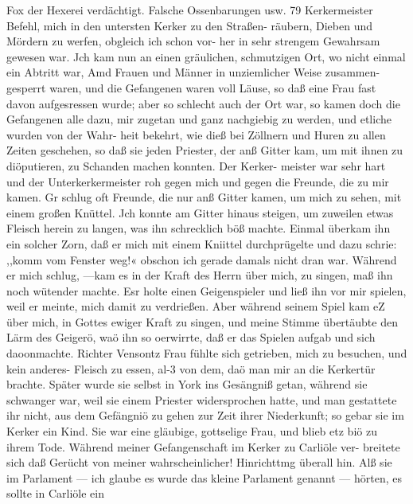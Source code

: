 Fox der Hexerei verdächtigt. Falsche Ossenbarungen usw. 79
Kerkermeister Befehl, mich in den untersten Kerker zu den Straßen-
räubern, Dieben und Mördern zu werfen, obgleich ich schon vor-
her in sehr strengem Gewahrsam gewesen war. Jch kam nun
an einen gräulichen, schmutzigen Ort, wo nicht einmal ein Abtritt
war, Amd Frauen und Männer in unziemlicher Weise zusammen-
gesperrt waren, und die Gefangenen waren voll Läuse, so daß eine
Frau fast davon aufgesressen wurde; aber so schlecht auch der
Ort war, so kamen doch die Gefangenen alle dazu, mir zugetan
und ganz nachgiebig zu werden, und etliche wurden von der Wahr-
heit bekehrt, wie dieß bei Zöllnern und Huren zu allen Zeiten
geschehen, so daß sie jeden Priester, der anß Gitter kam, um mit
ihnen zu diöputieren, zu Schanden machen konnten. Der Kerker-
meister war sehr hart und der Unterkerkermeister roh gegen mich und
gegen die Freunde, die zu mir kamen. Gr schlug oft Freunde,
die nur anß Gitter kamen, um mich zu sehen, mit einem großen
Knüttel. Jch konnte am Gitter hinaus steigen, um zuweilen etwas
Fleisch herein zu langen, was ihn schrecklich böß machte. Einmal
überkam ihn ein solcher Zorn, daß er mich mit einem Kniittel
durchprügelte und dazu schrie: ,,komm vom Fenster weg!« obschon
ich gerade damals nicht dran war. Während er mich schlug,
—kam es in der Kraft des Herrn über mich, zu singen, maß ihn
noch wütender machte. Esr holte einen Geigenspieler und ließ
ihn vor mir spielen, weil er meinte, mich damit zu verdrießen.
Aber während seinem Spiel kam eZ über mich, in Gottes ewiger
Kraft zu singen, und meine Stimme übertäubte den Lärm des
Geigerö, waö ihn so oerwirrte, daß er das Spielen aufgab und
sich daoonmachte.
Richter Vensontz Frau fühlte sich getrieben, mich zu besuchen,
und kein anderes- Fleisch zu essen, al-3 von dem, daö man mir
an die Kerkertür brachte. Später wurde sie selbst in York ins
Gesängniß getan, während sie schwanger war, weil sie einem
Priester widersprochen hatte, und man gestattete ihr nicht, aus
dem Gefängniö zu gehen zur Zeit ihrer Niederkunft; so gebar
sie im Kerker ein Kind. Sie war eine gläubige, gottselige Frau,
und blieb etz biö zu ihrem Tode.
Während meiner Gefangenschaft im Kerker zu Carliöle ver-
breitete sich daß Gerücht von meiner wahrscheinlicher! Hinrichttmg
überall hin. Alß sie im Parlament — ich glaube es wurde das
kleine Parlament genannt — hörten, es sollte in Carliöle ein


